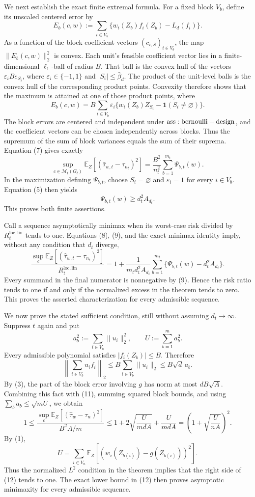 We next establish the exact finite extremal formula. For a fixed block \(V_b\), define its unscaled centered error by
\[
E_b(c,w):=\sum_{i\in V_b}\{w_i(Z_b)f_i(Z_b)-L_d(f_i)\}.
\]
As a function of the block coefficient vectors \((c_{i,S})_{i\in V_b}\), the map \(\|E_b(c,w)\|_2^2\) is convex. Each unit's feasible coefficient vector lies in a finite-dimensional \(\ell_1\)-ball of radius \(B\). That ball is the convex hull of the vectors \(\varepsilon_iB e_{S_i}\), where \(\varepsilon_i\in\{-1,1\}\) and \(|S_i|\le\bar\beta_d\). The product of the unit-level balls is the convex hull of the corresponding product points. Convexity therefore shows that the maximum is attained at one of those product points, where
\[
E_b(c,w)=B\sum_{i\in V_b}\varepsilon_i
\{w_i(Z_b)Z_{S_i}-\mathbf1(S_i\ne\varnothing)\}.
\tag{7}
\]
The block errors are centered and independent under \({\rm ass:bernoulli-design}\), and the coefficient vectors can be chosen independently across blocks. Thus the supremum of the sum of block variances equals the sum of their suprema. Equation (7) gives exactly
\[
\sup_{c\in\mathcal M_t(G_t)}
\mathbb E_Z[(\widehat\tau_{w,t}-\tau_{n_t})^2]
=\frac{B^2}{n_t^2}\sum_{b=1}^{m_t}\Psi_{b,t}(w).
\tag{8}
\]
In the maximization defining \(\Psi_{b,t}\), choose \(S_i=\varnothing\) and \(\varepsilon_i=1\) for every \(i\in V_b\). Equation (5) then yields
\[
\Psi_{b,t}(w)\ge d_t^2A_{d_t}.
\tag{9}
\]
This proves both finite assertions.

Call a sequence asymptotically minimax when its worst-case risk divided by \(R_t^{\mathrm{loc,lin}}\) tends to one. Equations (8), (9), and the exact minimax identity imply, without any condition that \(d_t\) diverge,
\[
\frac{\sup_c\mathbb E_Z[(\widehat\tau_{w,t}-\tau_{n_t})^2]}
{R_t^{\mathrm{loc,lin}}}
=1+\frac{1}{m_td_t^2A_{d_t}}
\sum_{b=1}^{m_t}\{\Psi_{b,t}(w)-d_t^2A_{d_t}\}.
\tag{10}
\]
Every summand in the final numerator is nonnegative by (9). Hence the risk ratio tends to one if and only if the normalized excess in the theorem tends to zero. This proves the asserted characterization for every admissible sequence.

We now prove the stated sufficient condition, still without assuming \(d_t\to\infty\). Suppress \(t\) again and put
\[
a_b^2:=\sum_{i\in V_b}\|u_i\|_2^2,
\qquad U:=\sum_{b=1}^m a_b^2.
\]
Every admissible polynomial satisfies \(|f_i(Z_b)|\le B\). Therefore
\[
\left\|\sum_{i\in V_b}u_i f_i\right\|_2
\le B\sum_{i\in V_b}\|u_i\|_2
\le B\sqrt d\,a_b.
\tag{11}
\]
By (3), the part of the block error involving \(g\) has norm at most \(dB\sqrt A\). Combining this fact with (11), summing squared block bounds, and using \(\sum_ba_b\le\sqrt{mU}\), we obtain
\[
1\le
\frac{\sup_c\mathbb E_Z[(\widehat\tau_w-\tau_n)^2]}{B^2A/m}
\le1+2\sqrt{\frac{U}{mdA}}+\frac{U}{mdA}
=\left(1+\sqrt{\frac{U}{nA}}\right)^2.
\tag{12}
\]
By (1),
\[
U=\sum_{i\in V_n}\mathbb E_Z[(w_i(Z_{b(i)})-g(Z_{b(i)}))^2].
\]
Thus the normalized \(L^2\) condition in the theorem implies that the right side of (12) tends to one. The exact lower bound in (12) then proves asymptotic minimaxity for every admissible sequence.

